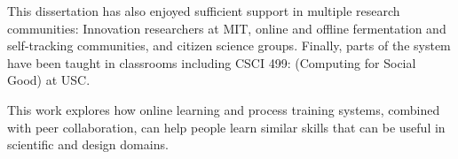 This dissertation has also enjoyed sufficient support in multiple research communities: Innovation researchers at MIT, online and offline fermentation and self-tracking communities, and citizen science groups. Finally, parts of the system have been taught in classrooms including CSCI 499: (Computing for Social Good) at USC. 

This work explores how online learning and process training systems, combined with
peer collaboration, can help people learn similar skills that
can be useful in scientific and design domains.











